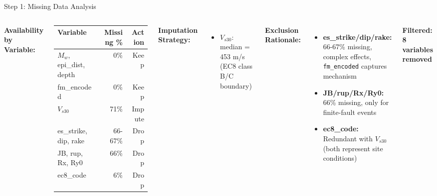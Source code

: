 \documentclass[aspectratio=169,11pt]{beamer}
\begin{document}
\begin{frame}{Step 1: Missing Data Analysis}
\begin{columns}[T]
\textbf{Availability by Variable:}
\begin{table}
\centering
\scriptsize
\begin{tabular}{@{}lrr@{}}
\toprule
\textbf{Variable} & \textbf{Missing \%} & \textbf{Action} \\
\midrule
$M_w$, epi\_dist, depth & 0\% & Keep \\
fm\_encoded & 0\% & Keep \\
$V_{s30}$ & 71\% & Impute \\
es\_strike, dip, rake & 66-67\% & Drop \\
JB, rup, Rx, Ry0 & 66\% & Drop \\
ec8\_code & 6\% & Drop \\
\bottomrule
\end{tabular}
\end{table}

\vspace{0.3cm}
\textbf{Imputation Strategy:}
\begin{itemize}
    \item $V_{s30}$: median = 453 m/s (EC8 class B/C boundary)
\end{itemize}

\textbf{Exclusion Rationale:}
\begin{itemize}
    \item \textbf{es\_strike/dip/rake:} 66-67\% missing, complex effects, \texttt{fm\_encoded} captures mechanism
    \item \textbf{JB/rup/Rx/Ry0:} 66\% missing, only for finite-fault events
    \item \textbf{ec8\_code:} Redundant with $V_{s30}$ (both represent site conditions)
\end{itemize}

\vspace{0.2cm}
\textcolor{alertred}{\textbf{Filtered: 8 variables removed}}
\end{columns}
\end{frame}
\end{document}
